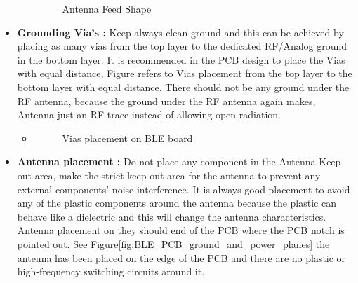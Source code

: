 \begin{itemize}
\begin{itemize}
\begin{figure}[h]
					\caption{Antenna Feed Shape}
					\centering
					\label{fig:Antenna_Feed_Shape}
				\end{figure}
			\end{itemize}
	\item \textbf{Grounding Via's :} Keep always clean ground and this can be achieved by placing as many vias from the top layer to the dedicated RF/Analog ground in the bottom layer. It is recommended in the PCB design to place the Vias with equal distance, Figure refers to Vias placement from the top layer to the bottom layer with equal distance. There should not be any ground under the RF antenna, because the ground under the RF antenna again makes, Antenna just an RF trace instead of allowing open radiation.
	\begin{itemize}
		\item 
		\begin{figure}[h]
			\centering
			\qquad
			\caption{Vias placement on BLE board}
			\centering
			\label{fig:Antenna_Feed_Shape}
		\end{figure}
	\end{itemize} 
	\item \textbf{Antenna placement :} Do not place any component in the Antenna Keep out area, make the strict keep-out area for the antenna to prevent any external components' noise interference. It is always good placement to avoid any of the plastic components around the antenna because the plastic can behave like a dielectric and this will change the antenna characteristics. Antenna placement on they should end of the PCB where the PCB notch is pointed out. See Figure\ref{fig:BLE_PCB_ground_and_power_planes} the antenna has been placed on the edge of the PCB and there are no plastic or high-frequency switching circuits around it.
\end{itemize}

